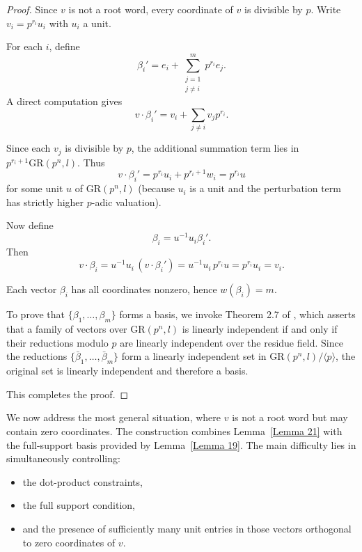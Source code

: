 \documentclass[10pt]{article}
\theoremstyle{definition}
\begin{document}
\begin{proof}
Since $v$ is not a root word, every coordinate of $v$ is divisible by $p$.
Write $v_i=p^{r_i}u_i$ with $u_i$ a unit.

For each $i$, define
\[
\beta_{i}'=e_i+\sum_{\substack{j=1 \\ j\neq i}}^m p^{r_i}e_j.
\]
A direct computation gives
\[
v\cdot \beta_i'
=
v_i + \sum_{j\neq i} v_j p^{r_i}.
\]

Since each $v_j$ is divisible by $p$, the additional summation term
lies in $p^{r_i+1}\mathrm{GR}(p^n,l)$.
Thus
\[
v\cdot \beta_i'
=
p^{r_i}u_i + p^{r_i+1}w_i
=
p^{r_i}u
\]
for some unit $u$ of $\mathrm{GR}(p^n,l)$
(because $u_i$ is a unit and the perturbation term has strictly higher $p$-adic valuation).

Now define
\[
\beta_i = u^{-1}u_i \beta_i'.
\]
Then
\[
v\cdot \beta_i
=
u^{-1}u_i \, (v\cdot \beta_i')
=
u^{-1}u_i \, p^{r_i}u
=
p^{r_i}u_i
=
v_i.
\]

Each vector $\beta_i$ has all coordinates nonzero,
hence $w(\beta_i)=m$.

To prove that $\{\beta_1,\dots,\beta_m\}$ forms a basis,
we invoke Theorem 2.7 of \cite{NortonSalagean},
which asserts that a family of vectors over $\mathrm{GR}(p^n,l)$
is linearly independent if and only if their reductions modulo $p$
are linearly independent over the residue field.
Since the reductions $\{\bar{\beta}_1,\dots,\bar{\beta}_m\}$
form a linearly independent set in
$\mathrm{GR}(p^n,l)/\langle p\rangle$,
the original set is linearly independent and therefore a basis.

This completes the proof.
\end{proof}

\medskip

We now address the most general situation, where $v$ is not a root word
but may contain zero coordinates.
The construction combines Lemma~\ref{Lemma 21}
with the full-support basis provided by Lemma~\ref{Lemma 19}.
The main difficulty lies in simultaneously controlling:

\begin{itemize}
\item the dot-product constraints,
\item the full support condition,
\item and the presence of sufficiently many unit entries
      in those vectors orthogonal to zero coordinates of $v$.
\end{itemize}
\end{document}
